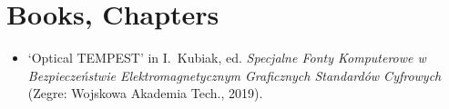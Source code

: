 \section*{Books, Chapters}
\vspace{-3mm}

\begin{itemize}
  \item `Optical TEMPEST' in I.\ Kubiak, ed. \emph{Specjalne Fonty
    Komputerowe w Bezpiecze\'{n}stwie Elektromagnetycznym Graficznych
    Standard\'{o}w Cyfrowych} (Zegre: Wojskowa Akademia Tech., 2019).
\end{itemize}

